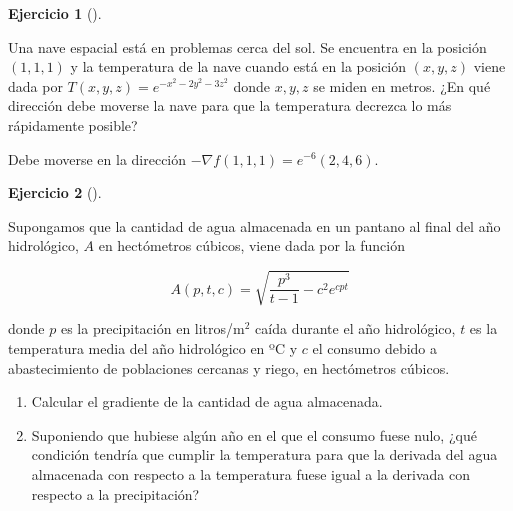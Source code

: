 \documentclass[
  a4paper,
]{scrreport}
\theoremstyle{definition}
\newtheorem{exercise}{Ejercicio}[chapter]
\theoremstyle{remark}
\begin{document}
\begin{exercise}[]\protect\hypertarget{exr-nave-espacial}{}\label{exr-nave-espacial}

Una nave espacial está en problemas cerca del sol. Se encuentra en la
posición \((1,1,1)\) y la temperatura de la nave cuando está en la
posición \((x,y,z)\) viene dada por \(T(x,y,z)=e^{-x^2-2y^2-3z^2}\)
donde \(x,y,z\) se miden en metros. ¿En qué dirección debe moverse la
nave para que la temperatura decrezca lo más rápidamente posible?

\end{exercise}

\begin{tcolorbox}[enhanced jigsaw, toprule=.15mm, bottomrule=.15mm, coltitle=black, toptitle=1mm, breakable, left=2mm, arc=.35mm, title=\textcolor{quarto-callout-tip-color}{\faLightbulb}\hspace{0.5em}{Solución}, titlerule=0mm, colback=white, colbacktitle=quarto-callout-tip-color!10!white, colframe=quarto-callout-tip-color-frame, bottomtitle=1mm, rightrule=.15mm, leftrule=.75mm, opacitybacktitle=0.6, opacityback=0]

Debe moverse en la dirección \(-\nabla f(1,1,1)=e^{-6}(2,4,6)\).

\end{tcolorbox}

\begin{exercise}[]\protect\hypertarget{exr-pantano}{}\label{exr-pantano}

Supongamos que la cantidad de agua almacenada en un pantano al final del
año hidrológico, \(A\) en hectómetros cúbicos, viene dada por la función

\[
A(p,t,c) = \sqrt {\frac{{p^3 }}{{t - 1}} - c^2 e^{cpt}}
\]

donde \(p\) es la precipitación en litros/m\(^2\) caí­da durante el año
hidrológico, \(t\) es la temperatura media del año hidrológico en ºC y
\(c\) el consumo debido a abastecimiento de poblaciones cercanas y
riego, en hectómetros cúbicos.

\begin{enumerate}
\def\labelenumi{\alph{enumi}.}
\item
  Calcular el gradiente de la cantidad de agua almacenada.
\item
  Suponiendo que hubiese algún año en el que el consumo fuese nulo, ¿qué
  condición tendría­ que cumplir la temperatura para que la derivada del
  agua almacenada con respecto a la temperatura fuese igual a la
  derivada con respecto a la precipitación?
\end{enumerate}

\end{exercise}
\end{document}
